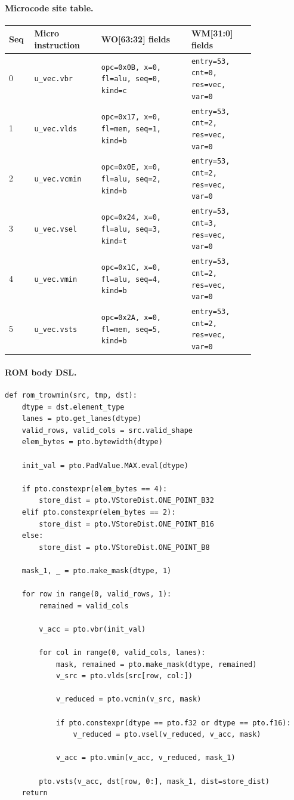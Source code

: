 \paragraph{Microcode site table.}
{\scriptsize
\begin{longtable}{@{}R{0.055\linewidth}L{0.23\linewidth}L{0.31\linewidth}L{0.22\linewidth}@{}}
\toprule
Seq & Micro instruction & WO[63:32] fields & WM[31:0] fields \\
 & \texttt{u\_vec.vbr} & \texttt{opc=0x0B, x=0, fl=alu, seq=0, kind=c} & \texttt{entry=53, cnt=0, res=vec, var=0} \\
1 & \texttt{u\_vec.vlds} & \texttt{opc=0x17, x=0, fl=mem, seq=1, kind=b} & \texttt{entry=53, cnt=2, res=vec, var=0} \\
2 & \texttt{u\_vec.vcmin} & \texttt{opc=0x0E, x=0, fl=alu, seq=2, kind=b} & \texttt{entry=53, cnt=2, res=vec, var=0} \\
3 & \texttt{u\_vec.vsel} & \texttt{opc=0x24, x=0, fl=alu, seq=3, kind=t} & \texttt{entry=53, cnt=3, res=vec, var=0} \\
4 & \texttt{u\_vec.vmin} & \texttt{opc=0x1C, x=0, fl=alu, seq=4, kind=b} & \texttt{entry=53, cnt=2, res=vec, var=0} \\
5 & \texttt{u\_vec.vsts} & \texttt{opc=0x2A, x=0, fl=mem, seq=5, kind=b} & \texttt{entry=53, cnt=2, res=vec, var=0} \\
\bottomrule
\end{longtable}
}
\paragraph{ROM body DSL.}
\begin{lstlisting}[style=ptocode]
def rom_trowmin(src, tmp, dst):
    dtype = dst.element_type
    lanes = pto.get_lanes(dtype)
    valid_rows, valid_cols = src.valid_shape
    elem_bytes = pto.bytewidth(dtype)

    init_val = pto.PadValue.MAX.eval(dtype)

    if pto.constexpr(elem_bytes == 4):
        store_dist = pto.VStoreDist.ONE_POINT_B32
    elif pto.constexpr(elem_bytes == 2):
        store_dist = pto.VStoreDist.ONE_POINT_B16
    else:
        store_dist = pto.VStoreDist.ONE_POINT_B8

    mask_1, _ = pto.make_mask(dtype, 1)

    for row in range(0, valid_rows, 1):
        remained = valid_cols

        v_acc = pto.vbr(init_val)

        for col in range(0, valid_cols, lanes):
            mask, remained = pto.make_mask(dtype, remained)
            v_src = pto.vlds(src[row, col:])

            v_reduced = pto.vcmin(v_src, mask)

            if pto.constexpr(dtype == pto.f32 or dtype == pto.f16):
                v_reduced = pto.vsel(v_reduced, v_acc, mask)

            v_acc = pto.vmin(v_acc, v_reduced, mask_1)

        pto.vsts(v_acc, dst[row, 0:], mask_1, dist=store_dist)
    return
\end{lstlisting}
\Needspace{0.34\textheight}
